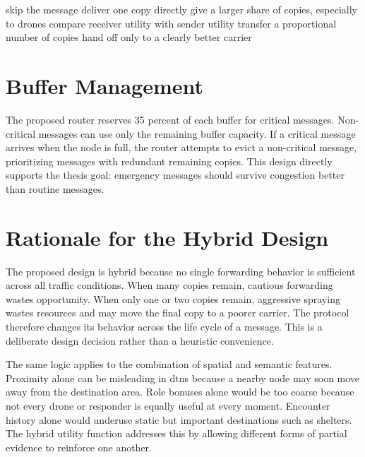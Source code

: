 \begin{algorithm}[h!]
\caption{Spatio-Semantic forwarding decision}
\begin{algorithmic}[1]
		\State skip the message
	\EndIf
		\State deliver one copy directly
		\State give a larger share of copies, especially to drones
		\State compare receiver utility with sender utility
			\State transfer a proportional number of copies
		\EndIf
		\State hand off only to a clearly better carrier
	\EndIf
\EndFor
\end{algorithmic}
\end{algorithm}

\section{Buffer Management}
The proposed router reserves 35 percent of each buffer for critical messages. Non-critical messages can use only the remaining buffer capacity. If a critical message arrives when the node is full, the router attempts to evict a non-critical message, prioritizing messages with redundant remaining copies. This design directly supports the thesis goal: emergency messages should survive congestion better than routine messages.

\section{Rationale for the Hybrid Design}
The proposed design is hybrid because no single forwarding behavior is sufficient across all traffic conditions. When many copies remain, cautious forwarding wastes opportunity. When only one or two copies remain, aggressive spraying wastes resources and may move the final copy to a poorer carrier. The protocol therefore changes its behavior across the life cycle of a message. This is a deliberate design decision rather than a heuristic convenience.

The same logic applies to the combination of spatial and semantic features. Proximity alone can be misleading in \acp{dtn} because a nearby node may soon move away from the destination area. Role bonuses alone would be too coarse because not every drone or responder is equally useful at every moment. Encounter history alone would underuse static but important destinations such as shelters. The hybrid utility function addresses this by allowing different forms of partial evidence to reinforce one another.

